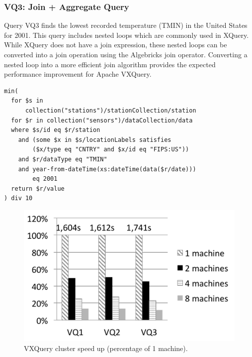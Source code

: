 \subsubsection*{VQ3: Join + Aggregate Query}\label{query:VQ3}
Query VQ3 finds the lowest recorded temperature (TMIN) in the United States for 2001. 
This query includes nested loops which are commonly used in XQuery.
While XQuery does not have a join expression, these nested loops can be converted into a join operation using the Algebricks join operator.
Converting a nested loop into a more efficient join algorithm provides the expected performance improvement for Apache VXQuery.


\begin{lstlisting}
min(
  for $s in 
      collection("stations")/stationCollection/station
  for $r in collection("sensors")/dataCollection/data
  where $s/id eq $r/station
    and (some $x in $s/locationLabels satisfies 
        ($x/type eq "CNTRY" and $x/id eq "FIPS:US"))
    and $r/dataType eq "TMIN" 
    and year-from-dateTime(xs:dateTime(data($r/date))) 
        eq 2001
  return $r/value
) div 10
\end{lstlisting}



\begin{figure}[tb]
\includegraphics[width=\columnfigurewidth]{images/vxquery_speed_up}
\centering
\vspace{-2ex}
\caption{VXQuery cluster speed up (percentage of 1 machine).}
\label{fig:vxquery_speed_up}
\end{figure}

